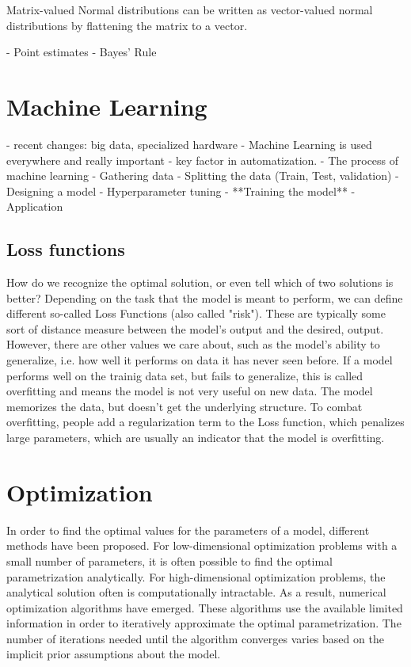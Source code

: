 \documentclass[twoside,12pt,a4paper]{report}
\begin{document}
Matrix-valued Normal distributions can be written as vector-valued normal distributions by flattening the matrix to a vector.

\begin{markdown}
- Point estimates
- Bayes' Rule
\end{markdown}

\section{Machine Learning}
\begin{markdown}
- recent changes: big data, specialized hardware
- Machine Learning is used everywhere and really important
	- key factor in automatization.
- The process of machine learning
	- Gathering data
		- Splitting the data (Train, Test, validation)
	- Designing a model
		- Hyperparameter tuning
	- **Training the model**
	- Application
	
\subsection{Loss functions}
How do we recognize the optimal solution, or even tell which of two solutions is better?
Depending on the task that the model is meant to perform, we can define different so-called Loss Functions (also called "risk"). These are typically some sort of distance measure between the model's output and the desired, output.
However, there are other values we care about, such as the model's ability to generalize, i.e. how well it performs on data it has never seen before. If a model performs well on the trainig data set, but fails to generalize, this is called overfitting and means the model is not very useful on new data. The model memorizes the data, but doesn't get the underlying structure. To combat overfitting, people add a regularization term to the Loss function, which penalizes large parameters, which are usually an indicator that the model is overfitting.

\end{markdown}

\section{Optimization}
In order to find the optimal values for the parameters of a model, different methods have been proposed. For low-dimensional optimization problems with a small number of parameters, it is often possible to find the optimal parametrization analytically. For high-dimensional optimization problems, the analytical solution often is computationally intractable. As a result, numerical optimization algorithms have emerged.
These algorithms use the available limited information in order to iteratively approximate the optimal parametrization. The number of iterations needed until the algorithm converges varies based on the implicit prior assumptions about the model.
\end{document}
